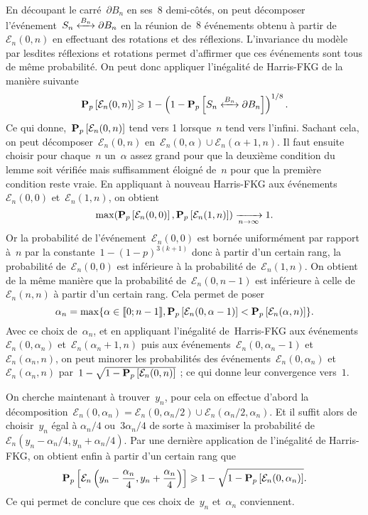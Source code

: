 	\begin{dem}
		En découpant le carré~$\partial B_n$ en ses~$8$ demi-côtés, on peut décomposer l'événement~$\relie[B_n]{S_n}{\partial B_n}$ en la réunion de~$8$ événements obtenu à partir de~$\mathcal{E}_n(0, n)$ en effectuant des rotations et des réflexions. L'invariance du modèle par lesdites réflexions et rotations permet d'affirmer que ces événements sont tous de même probabilité. On peut donc appliquer l'inégalité de Harris-FKG de la manière suivante
		\[
			\Pp{\mathcal{E}_n(0,n)} \geq 1 - \left(1 - \Pp{\relie[B_n]{S_n}{\partial B_n}} \right)^{1/8}.
		\]
		Ce qui donne,~$\bm{\mathrm{P}}_{p}\left[\mathcal{E}_n(0, n)\right]$ tend vers 1 lorsque~$n$ tend vers l'infini. Sachant cela, on peut décomposer~$\mathcal{E}_n(0, n)$ en~$\mathcal{E}_n(0, \alpha) \cup \mathcal{E}_n(\alpha + 1, n)$. Il faut ensuite choisir pour chaque~$n$ un~$\alpha$ assez grand pour que la deuxième condition du lemme soit vérifiée mais suffisamment éloigné de~$n$ pour que la première condition reste vraie. En appliquant à nouveau Harris-FKG aux événements~$\mathcal{E}_n(0, 0)$ et~$\mathcal{E}_n(1, n)$, on obtient
		\[
			\max(\bm{\mathrm{P}}_{p}\left[\mathcal{E}_n(0, 0)\right], \bm{\mathrm{P}}_{p}\left[\mathcal{E}_n(1, n)\right]) \xrightarrow[n \to \infty]{} 1.
		\]
		Or la probabilité de l'événement~$\mathcal{E}_n(0,0)$ est bornée uniformément par rapport à~$n$ par la constante~$1 - (1-p)^{3(k+1)}$ donc à partir d'un certain rang, la probabilité de~$\mathcal{E}_n(0,0)$ est inférieure à la probabilité de~$\mathcal{E}_n(1, n)$. On obtient de la même manière que la probabilité de~$\mathcal{E}_n(0, n-1)$ est inférieure à celle de~$\mathcal{E}_n(n, n)$ à partir d'un certain rang. Cela permet de poser
		\[
			\alpha_n = \max \{ \alpha \in \llbracket 0;n-1 \rrbracket, \bm{\mathrm{P}}_{p}\left[\mathcal{E}_n(0, \alpha - 1)\right] < \bm{\mathrm{P}}_{p}\left[\mathcal{E}_n(\alpha, n)\right] \}.
		\]
		Avec ce choix de~$\alpha_n$, et en appliquant l'inégalité de~Harris-FKG aux événements~$\mathcal{E}_n(0, \alpha_n)$ et~$\mathcal{E}_n(\alpha_n + 1, n)$ puis aux événements~$\mathcal{E}_n(0, \alpha_n - 1)$ et~$\mathcal{E}_n(\alpha_n, n)$, on peut minorer les probabilités des événements~$\mathcal{E}_n(0, \alpha_n)$ et~$\mathcal{E}_n(\alpha_n, n)$ par~$1 - \sqrt{1  - \bm{\mathrm{P}}_{p}\left[\mathcal{E}_n(0, n)\right]}$ ; ce qui donne leur convergence vers~$1$. 

		On cherche maintenant à trouver~$y_n$, pour cela on effectue d'abord la décomposition~$\mathcal{E}_n(0, \alpha_n) = \mathcal{E}_n(0, \alpha_n/2) \cup \mathcal{E}_n(\alpha_n/2, \alpha_n)$. Et il suffit alors de choisir~$y_n$ égal à $\alpha_n/4$ ou~$3\alpha_n/4$ de sorte à maximiser la probabilité de~$\mathcal{E}_n(y_n - \alpha_n/4, y_n + \alpha_n/4)$. Par une dernière application de l'inégalité de Harris-FKG, on obtient enfin à partir d'un certain rang que
		\[
			\bm{\mathrm{P}}_{p}\left[\mathcal{E}_n\left(y_n - \frac{\alpha_n}{4}, y_n + \frac{\alpha_n}{4}\right)\right]
					\geqslant 1 - \sqrt{1 - \bm{\mathrm{P}}_{p}\left[\mathcal{E}_n(0, \alpha_n)\right]}.
		\]
		Ce qui permet de conclure que ces choix de~$y_n$ et~$\alpha_n$ conviennent.
	\end{dem}
